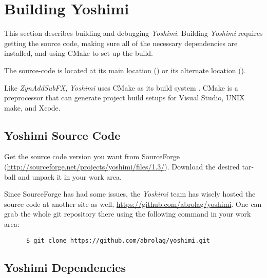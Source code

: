 %
%
%

\section{Building Yoshimi}
\label{sec:yoshimi_build}

   This section describes building and debugging \textsl{Yoshimi}.
   Building \textsl{Yoshimi} requires getting the source code, making sure
   all of the necessary dependencies are installed, and using CMake to set
   up the build.

   The source-code is located at its main location (\cite{yoshimi})
   or its alternate location (\cite{yoshimi2}).

   Like \textsl{ZynAddSubFX}, \textsl{Yoshimi} uses CMake as its build
   system \cite{zyncmake}.  CMake is a preprocessor that can generate
   project build setups for Visual Studio, UNIX make, and Xcode.

\subsection{Yoshimi Source Code}
\label{subsec:yoshimi_source_code}

   Get the source code version you want from SourceForge
   (\url{http://sourceforge.net/projects/yoshimi/files/1.3/}).
   Download the desired tar-ball and unpack it in your work area.

   Since SourceForge has had some issues, the \textsl{Yoshimi} team
   has wisely hosted the source code at another site as well,
   \url{https://github.com/abrolag/yoshimi}.  One can grab the whole
   git repository there using the following command in your work area:

   \begin{verbatim}
      $ git clone https://github.com/abrolag/yoshimi.git
   \end{verbatim}

\subsection{Yoshimi Dependencies}
\label{subsec:yoshimi_dependencies}

